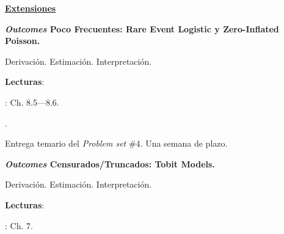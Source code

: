 \documentclass[letterpaper]{article}
\renewenvironment{itemize}{
  \begin{list}{}{
    \setlength{\leftmargin}{1.5em}
  }
}{
  \end{list}
}
\begin{document}
\begin{enumerate}[label=\roman*.]
\item {\bf {\color{ForestGreen}\underline{Extensiones}}}

      \begin{itemize} 
        \item[18.] {\bf \emph{Outcomes} Poco Frecuentes: Rare Event Logistic y Zero-Inflated Poisson.}
        \begin{itemize} 
          \item[$\circ$] Derivaci\'on. Estimaci\'on. Interpretaci\'on.
          \item[$\circ$] {\bf Lecturas}: 
            \begin{itemize} 
              \item[$\diamond$] \textcite{Long2001}: Ch. 8.5---8.6.
              \item[$\diamond$] \href{https://github.com/hbahamonde/MLE/raw/master/Readings/King_2001.pdf}{\textcite{King2001}}.
            \end{itemize}
        \end{itemize}
      \end{itemize}


\item[{\color{red}\Pointinghand}] Entrega temario del \emph{Problem set} \#4. Una semana de plazo.


     \begin{itemize} 
        \item[19.] {\bf \emph{Outcomes} Censurados/Truncados: Tobit Models.}
        \begin{itemize} 
          \item[$\circ$] Derivaci\'on. Estimaci\'on. Interpretaci\'on.
          \item[$\circ$] {\bf Lecturas}: 
            \begin{itemize} 
              \item[$\diamond$] \textcite{Long2001}: Ch. 7.
            \end{itemize}
        \end{itemize}
      \end{itemize}



\end{enumerate}
\end{document}
